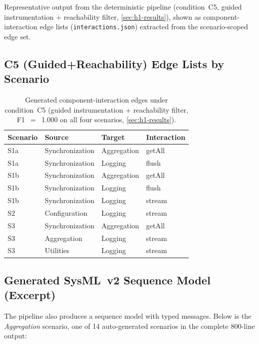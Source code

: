 Representative output from the deterministic pipeline (condition~C5,
guided instrumentation + reachability filter,
\cref{sec:h1-results}), shown as component-interaction
edge lists (\texttt{interactions.json}) extracted from the
scenario-scoped edge set.

\subsection{C5 (Guided+Reachability) Edge Lists by Scenario}

\begin{table}[h]
\centering
\caption{Generated component-interaction edges under condition~C5
  (guided instrumentation + reachability filter, F1~$=$~1.000 on all
  four scenarios, \cref{sec:h1-results}).}
\label{tab:c5-edges}
\begin{tabular}{llll}
\toprule
\textbf{Scenario} & \textbf{Source} & \textbf{Target} & \textbf{Interaction} \\
\midrule
S1a & Synchronization & Aggregation & getAll \\
S1a & Synchronization & Logging     & flush \\
\midrule
S1b & Synchronization & Aggregation & getAll \\
S1b & Synchronization & Logging     & flush \\
S1b & Synchronization & Logging     & stream \\
\midrule
S2 & Configuration   & Logging     & stream \\
\midrule
S3 & Synchronization & Aggregation & getAll \\
S3 & Aggregation     & Logging     & stream \\
S3 & Utilities       & Logging     & stream \\
\bottomrule
\end{tabular}
\end{table}

\subsection{Generated SysML~v2 Sequence Model (Excerpt)}

The pipeline also produces a \sysml sequence model with typed messages.
Below is the \emph{Aggregation} scenario, one of 14 auto-generated
scenarios in the complete 800-line output:

